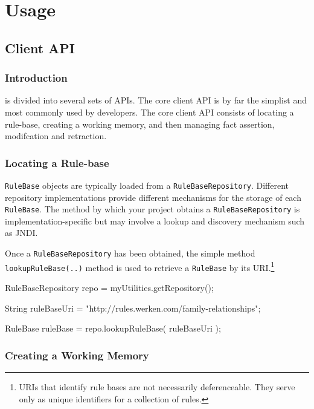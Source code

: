 \chapter{Usage}

\section{\drools{} Client API}

\subsection{Introduction}

\drools{} is divided into several sets of APIs.  The core client API
is by far the simplist and most commonly used by developers.  The
core \drools{} client API consists of locating a rule-base, creating
a working memory, and then managing fact assertion, modifcation and
retraction.

\subsection{Locating a Rule-base}

\verb|RuleBase| objects are typically loaded from a
\verb|RuleBaseRepository|.  Different repository implementations
provide different mechanisms for the storage of each
\verb|RuleBase|.  The method by which your project obtains
a \verb|RuleBaseRepository| is implementation-specific but
may involve a lookup and discovery mechanism such as JNDI.

Once a \verb|RuleBaseRepository| has been obtained, the
simple method\\ \verb|lookupRuleBase(..)| method is used
to retrieve a \verb|RuleBase| by its URI.\footnote{URIs that
identify rule bases are not necessarily deferenceable.  They
serve only as unique identifiers for a collection of rules.}

\bigskip
\begin{codelisting}
RuleBaseRepository repo = myUtilities.getRepository();

String ruleBaseUri = "http://rules.werken.com/family-relationships";

RuleBase ruleBase = repo.lookupRuleBase( ruleBaseUri );
\end{codelisting}

\newpage

\subsection{Creating a Working Memory}

